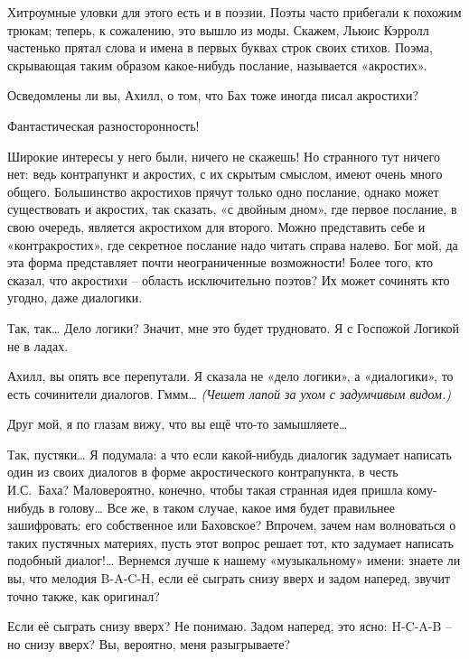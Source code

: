 \documentclass[../main.tex]{subfiles}
\begin{document}
\begin{Dialogue}
 {\Large Х}итроумные уловки для этого есть и в поэзии. Поэты часто прибегали к похожим трюкам; теперь, к сожалению, это вышло из моды. Скажем, Льюис Кэрролл частенько прятал слова и имена в первых буквах строк своих стихов. Поэма, скрывающая таким образом какое-нибудь послание, называется «акростих».

 Осведомлены ли вы, Ахилл, о том, что Бах тоже иногда писал акростихи?

 Фантастическая разносторонность!

 Широкие интересы у него были, ничего не скажешь! Но странного тут ничего нет: ведь контрапункт и акростих, с их скрытым смыслом, имеют очень много общего. Большинство акростихов прячут только одно послание, однако может существовать и акростих, так сказать, «с двойным дном», где первое послание, в свою очередь, является акростихом для второго. Можно представить себе и «контракростих», где секретное послание надо читать справа налево. Бог мой, да эта форма представляет почти неограниченные возможности! Более того, кто сказал, что акростихи \--- область исключительно поэтов? Их может сочинять кто угодно, даже диалогики.

 Так, так\ldots{} Дело логики? Значит, мне это будет трудновато. Я с Госпожой Логикой не в ладах.

 Ахилл, вы опять все перепутали. Я сказала не «дело логики», а «диалогики», то есть сочинители диалогов. Гммм\ldots{} \emph{(Чешет лапой за ухом с задумчивым видом.)}

 Друг мой, я по глазам вижу, что вы ещё что-то замышляете\ldots{}

 Так, пустяки\ldots{} Я подумала: а что если какой-нибудь диалогик задумает написать один из своих диалогов в форме акростического контрапункта, в честь И.С.~Баха? Маловероятно, конечно, чтобы такая странная идея пришла кому-нибудь в голову\ldots{} Все же, в таком случае, какое имя будет правильнее зашифровать: его собственное или Баховское? Впрочем, зачем нам волноваться о таких пустячных материях, пусть этот вопрос решает тот, кто задумает написать подобный диалог!\ldots{} Вернемся лучше к нашему «музыкальному» имени: знаете ли вы, что мелодия \mbox{B-A-C-H}, если её сыграть снизу вверх и задом наперед, звучит точно также, как оригинал?

 Если её сыграть снизу вверх? Не понимаю. Задом наперед, это ясно: \mbox{H-C-A-B} \--- но снизу вверх? Вы, вероятно, меня разыгрываете?


\end{Dialogue}
\end{document}
